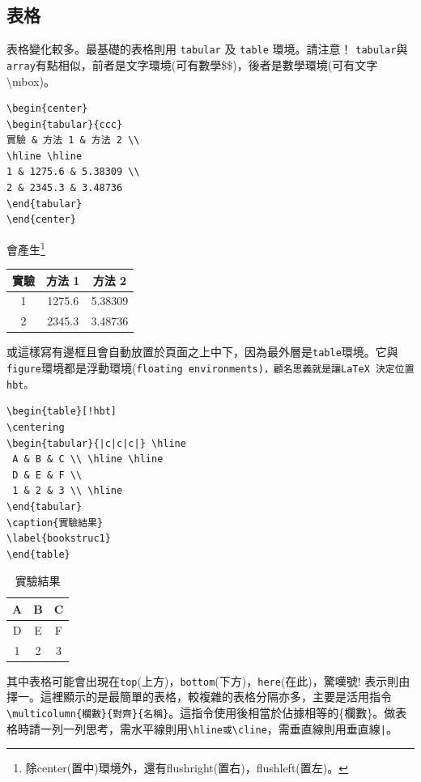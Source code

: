 \subsection{表格}
表格變化較多。最基礎的表格則用 {\tt tabular} 及 {\tt table} 環境。請注意！
{\tt tabular}與{\tt array}有點相似，前者是文字環境(可有數學\$\$)，後者是數學環境(可有文字\textbackslash mbox)。\\
\begin{Verbatim}[frame=single,firstline=1,label=Tabular 1]
\begin{center}
\begin{tabular}{ccc}
實驗 & 方法 1 & 方法 2 \\  
\hline \hline
1 & 1275.6 & 5.38309 \\ 
2 & 2345.3 & 3.48736
\end{tabular}
\end{center}
\end{Verbatim}
會產生\footnote{除center(置中)環境外，還有flushright(置右)，flushleft(置左)。}
\begin{center}
\begin{tabular}{ccc}
實驗 & 方法 1 & 方法 2 \\  \hline \hline 
1 & 1275.6 & 5.38309  \\ 
2 & 2345.3 & 3.48736
\end{tabular}
\end{center}  
%
或這樣寫有邊框且會自動放置於頁面之上中下，因為最外層是{\tt table}環境。它與{\tt figure}環境都是浮動環境(\tt floating environments)，顧名思義就是讓\LaTeX\ 決定位置{\tt hbt}。\\ 
\begin{Verbatim}[frame=single,firstline=1,label=Tabular 2]
\begin{table}[!hbt]
\centering
\begin{tabular}{|c|c|c|} \hline 
 A & B & C \\ \hline \hline
 D & E & F \\
 1 & 2 & 3 \\ \hline
\end{tabular}
\caption{實驗結果} 
\label{bookstruc1}
\end{table}
\end{Verbatim}
\begin{table}[!hbt]
\centering  
\begin{tabular}{|c|c|c|} \hline        
A & B & C \\ \hline \hline
D & E & F \\
1 & 2 & 3 \\ \hline 
\end{tabular}
\caption{實驗結果}
\end{table} 
\label{bookstruc1} 
其中表格可能會出現在{\tt top}(上方)，{\tt bottom}(下方)，{\tt here}(在此)，驚嘆號$!$ 表示則由擇一。這裡顯示的是最簡單的表格，較複雜的表格分隔亦多，主要是活用指令\verb|\multicolumn{欄數}{對齊}{名稱}|。這指令使用後相當於佔據相等的\{欄數\}。做表格時請一列一列思考，需水平線則用\verb|\hline或\cline|，需垂直線則用垂直線\verb+|+。


